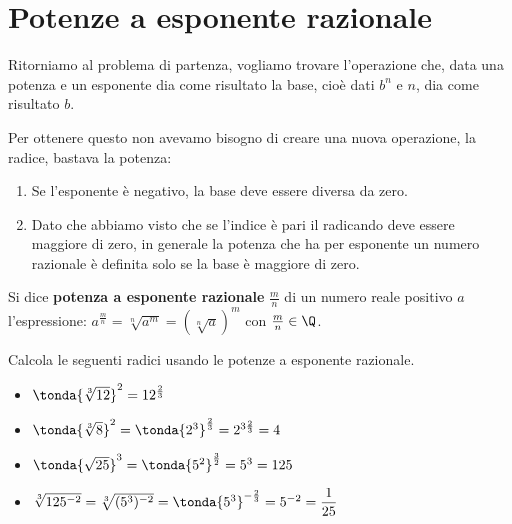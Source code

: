 
\section{Potenze a esponente razionale}
\label{sec:radicali_esp_razionale}

Ritorniamo al problema di partenza, vogliamo trovare l'operazione che, data 
una potenza e un esponente dia come risultato la base, cioè dati \(b^n\) e 
\(n\), dia come risultato \(b\).

Per ottenere questo non avevamo bisogno di creare una nuova operazione, la 
radice, bastava la potenza:


\begin{osservazioni}{}{}
\begin{enumerate}
\item Se l'esponente è negativo, 
la base deve essere diversa da zero.
\item Dato che abbiamo visto che se l'indice è pari il radicando deve 
essere
maggiore di zero, in generale la potenza che ha per esponente un numero 
razionale è definita solo se la base è maggiore di zero.
\end{enumerate}
\end{osservazioni}

\begin{definizione}{}{}
Si dice \textbf{potenza a esponente razionale}
\(\frac m n\) di un numero reale 
positivo \(a\) l'espressione:
\(a^{\frac m n}=\sqrt[n]{a^m}=\left(\sqrt[n]a\right)^m\) con 
\(\frac m n\in \Q\).
\end{definizione}

\begin{esempio}{}{}
Calcola le seguenti radici usando le potenze a esponente razionale.
\begin{itemize}
\item \(\tonda{\sqrt[3]{12}}^2=12^{\frac{2}{3}}\)
\item \(\tonda{\sqrt[3]{8}}^2=\tonda{2^3}^{\frac{2}{3}}=2^{3\frac{2}{3}}=4\)
\item \(\tonda{\sqrt{25}}^3=\tonda{5^2}^{\frac{3}{2}}=5^3=125\)
\item \(\sqrt[3]{125^{-2}}=\sqrt[3]{(5^3)^{-2}}=
      \tonda{5^3}^{-\frac{2}{3}}=5^{-2}=\dfrac 1{25}\)
\end{itemize}
\end{esempio}

